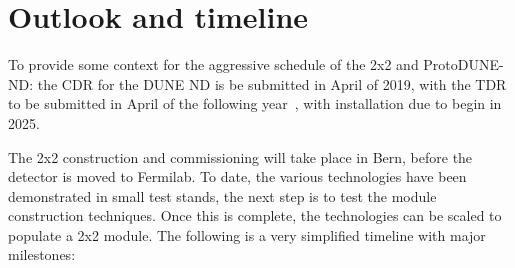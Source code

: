 \section{Outlook and timeline}
\label{sec:outlook}
To provide some context for the aggressive schedule of the 2x2 and ProtoDUNE-ND: the CDR for the DUNE ND is be submitted in April of 2019, with the TDR to be submitted in April of the following year~\cite{dune_dates}, with installation due to begin in 2025. 

The 2x2 construction and commissioning will take place in Bern, before the detector is moved to Fermilab. To date, the various technologies have been demonstrated in small test stands, the next step is to test the module construction techniques. Once this is complete, the technologies can be scaled to populate a 2x2 module. The following is a very simplified timeline with major milestones:      

